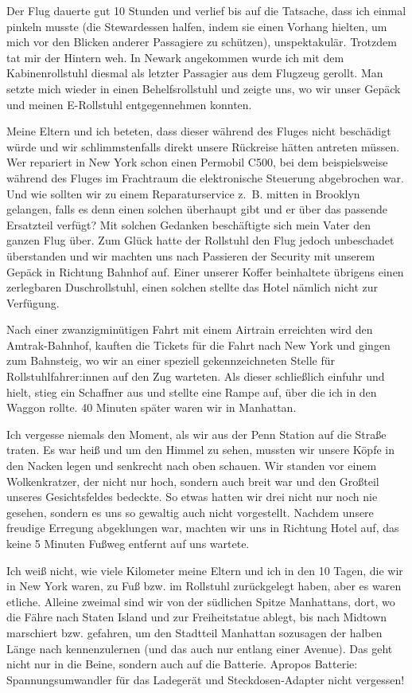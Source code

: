 \documentclass[fontsize=14pt,a4paper,headinclude,DIV=calc,automark]{scrbook}
\begin{document}
Der Flug dauerte gut 10 Stunden und verlief bis auf die Tatsache, dass ich einmal pinkeln musste (die Stewardessen halfen, indem sie einen Vorhang hielten, um mich vor den Blicken anderer Passagiere zu schützen), unspektakulär. Trotzdem tat mir der Hintern weh. In Newark angekommen wurde ich mit dem Kabinenrollstuhl diesmal als letzter Passagier aus dem Flugzeug gerollt. Man setzte mich wieder in einen Behelfsrollstuhl und zeigte uns, wo wir unser Gepäck und meinen E-Rollstuhl entgegennehmen konnten.

Meine Eltern und ich beteten, dass dieser während des Fluges nicht beschädigt würde und wir schlimmstenfalls direkt unsere Rückreise hätten antreten müssen. Wer repariert in New York schon einen Permobil C500, bei dem beispielsweise während des Fluges im Frachtraum die elektronische Steuerung abgebrochen war. Und wie sollten wir zu einem Reparaturservice z.~B. mitten in Brooklyn gelangen, falls es denn einen solchen überhaupt gibt und er über das passende Ersatzteil verfügt? Mit solchen Gedanken beschäftigte sich mein Vater den ganzen Flug über. Zum Glück hatte der Rollstuhl den Flug jedoch unbeschadet überstanden und wir machten uns nach Passieren der Security mit unserem Gepäck in Richtung Bahnhof auf. Einer unserer Koffer beinhaltete übrigens einen zerlegbaren Duschrollstuhl, einen solchen stellte das Hotel nämlich nicht zur Verfügung.

Nach einer zwanzigminütigen Fahrt mit einem Airtrain erreichten wird den Amtrak-Bahnhof, kauften die Tickets für die Fahrt nach New York und gingen zum Bahnsteig, wo wir an einer speziell gekennzeichneten Stelle für Rollstuhlfahrer:innen auf den Zug warteten. Als dieser schließlich einfuhr und hielt, stieg ein Schaffner aus und stellte eine Rampe auf, über die ich in den Waggon rollte. 40 Minuten später waren wir in Manhattan.

Ich vergesse niemals den Moment, als wir aus der Penn Station auf die Straße traten. Es war heiß und um den Himmel zu sehen, mussten wir unsere Köpfe in den Nacken legen und senkrecht nach oben schauen. Wir standen vor einem Wolkenkratzer, der nicht nur hoch, sondern auch breit war und den Großteil unseres Gesichtsfeldes bedeckte. So etwas hatten wir drei nicht nur noch nie gesehen, sondern es uns so gewaltig auch nicht vorgestellt. Nachdem unsere freudige Erregung abgeklungen war, machten wir uns in Richtung Hotel auf, das keine 5 Minuten Fußweg entfernt auf uns wartete.

Ich weiß nicht, wie viele Kilometer meine Eltern und ich in den 10 Tagen, die wir in New York waren, zu Fuß bzw. im Rollstuhl zurückgelegt haben, aber es waren etliche. Alleine zweimal sind wir von der südlichen Spitze Manhattans, dort, wo die Fähre nach Staten Island und zur Freiheitstatue ablegt, bis nach Midtown marschiert bzw. gefahren, um den Stadtteil Manhattan sozusagen der halben Länge nach kennenzulernen (und das auch nur entlang einer Avenue). Das geht nicht nur in die Beine, sondern auch auf die Batterie. Apropos Batterie: Spannungsumwandler für das Ladegerät und Steckdosen-Adapter nicht vergessen!
\end{document}
